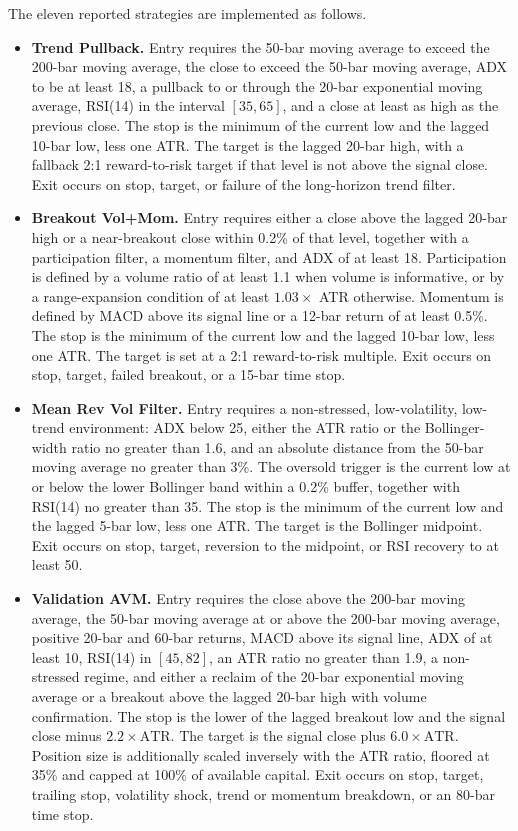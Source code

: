 \documentclass[preprint,12pt]{elsarticle}
\theoremstyle{definition}
\begin{document}
The eleven reported strategies are implemented as follows.
\begin{itemize}
\item \textbf{Trend Pullback.} Entry requires the 50-bar moving average to exceed the 200-bar moving average, the close to exceed the 50-bar moving average, ADX to be at least 18, a pullback to or through the 20-bar exponential moving average, RSI(14) in the interval \([35,65]\), and a close at least as high as the previous close. The stop is the minimum of the current low and the lagged 10-bar low, less one ATR. The target is the lagged 20-bar high, with a fallback 2:1 reward-to-risk target if that level is not above the signal close. Exit occurs on stop, target, or failure of the long-horizon trend filter.

\item \textbf{Breakout Vol+Mom.} Entry requires either a close above the lagged 20-bar high or a near-breakout close within 0.2\% of that level, together with a participation filter, a momentum filter, and ADX of at least 18. Participation is defined by a volume ratio of at least 1.1 when volume is informative, or by a range-expansion condition of at least \(1.03\times\) ATR otherwise. Momentum is defined by MACD above its signal line or a 12-bar return of at least 0.5\%. The stop is the minimum of the current low and the lagged 10-bar low, less one ATR. The target is set at a 2:1 reward-to-risk multiple. Exit occurs on stop, target, failed breakout, or a 15-bar time stop.

\item \textbf{Mean Rev Vol Filter.} Entry requires a non-stressed, low-volatility, low-trend environment: ADX below 25, either the ATR ratio or the Bollinger-width ratio no greater than 1.6, and an absolute distance from the 50-bar moving average no greater than 3\%. The oversold trigger is the current low at or below the lower Bollinger band within a 0.2\% buffer, together with RSI(14) no greater than 35. The stop is the minimum of the current low and the lagged 5-bar low, less one ATR. The target is the Bollinger midpoint. Exit occurs on stop, target, reversion to the midpoint, or RSI recovery to at least 50.

\item \textbf{Validation AVM.} Entry requires the close above the 200-bar moving average, the 50-bar moving average at or above the 200-bar moving average, positive 20-bar and 60-bar returns, MACD above its signal line, ADX of at least 10, RSI(14) in \([45,82]\), an ATR ratio no greater than 1.9, a non-stressed regime, and either a reclaim of the 20-bar exponential moving average or a breakout above the lagged 20-bar high with volume confirmation. The stop is the lower of the lagged breakout low and the signal close minus \(2.2\times \mathrm{ATR}\). The target is the signal close plus \(6.0\times \mathrm{ATR}\). Position size is additionally scaled inversely with the ATR ratio, floored at 35\% and capped at 100\% of available capital. Exit occurs on stop, target, trailing stop, volatility shock, trend or momentum breakdown, or an 80-bar time stop.


\end{itemize}
\end{document}
